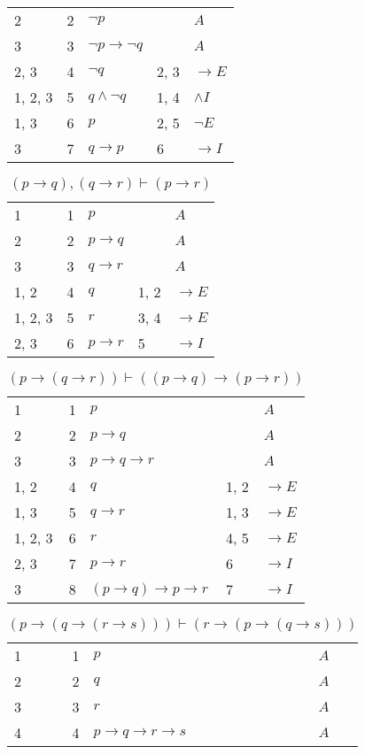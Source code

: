 \documentclass{article}
\begin{document}
\begin{table}[htbp]
\begin{tabular}{lrlll}
{2} & 2 & $¬p$ & {} & $A$ \\
{3} & 3 & $¬p→ ¬q$ & {} & $A$ \\
{2, 3} & 4 & $¬q$ & {2, 3} & $→E$ \\
{1, 2, 3} & 5 & $q∧ ¬q$ & {1, 4} & $∧I$ \\
{1, 3} & 6 & $p$ & {2, 5} & $¬E$ \\
{3} & 7 & $q→p$ & {6} & $→I$ \\
\end{tabular}
\end{table}\begin{table}[htbp]\caption*{$(p → q),(q → r) ⊢ (p → r)$}\centering\begin{tabular}{lrlll}
{1} & 1 & $p$ & {} & $A$ \\
{2} & 2 & $p→q$ & {} & $A$ \\
{3} & 3 & $q→r$ & {} & $A$ \\
{1, 2} & 4 & $q$ & {1, 2} & $→E$ \\
{1, 2, 3} & 5 & $r$ & {3, 4} & $→E$ \\
{2, 3} & 6 & $p→r$ & {5} & $→I$ \\
\end{tabular}
\end{table}\begin{table}[htbp]\caption*{$(p → (q → r)) ⊢ ((p → q) → (p → r))$}\centering\begin{tabular}{lrlll}
{1} & 1 & $p$ & {} & $A$ \\
{2} & 2 & $p→q$ & {} & $A$ \\
{3} & 3 & $p→q→r$ & {} & $A$ \\
{1, 2} & 4 & $q$ & {1, 2} & $→E$ \\
{1, 3} & 5 & $q→r$ & {1, 3} & $→E$ \\
{1, 2, 3} & 6 & $r$ & {4, 5} & $→E$ \\
{2, 3} & 7 & $p→r$ & {6} & $→I$ \\
{3} & 8 & $(p→q)→p→r$ & {7} & $→I$ \\
\end{tabular}
\end{table}\begin{table}[htbp]\caption*{$(p → (q → (r → s))) ⊢ (r → (p → (q → s)))$}\centering\begin{tabular}{lrlll}
{1} & 1 & $p$ & {} & $A$ \\
{2} & 2 & $q$ & {} & $A$ \\
{3} & 3 & $r$ & {} & $A$ \\
{4} & 4 & $p→q→r→s$ & {} & $A$ \\

\end{tabular}
\end{table}
\end{document}
